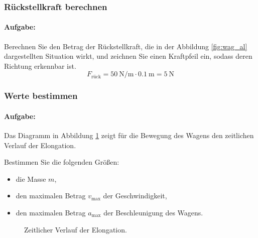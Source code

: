 \documentclass{ajc}
\begin{document}
	\subsubsection{Rückstellkraft berechnen}
	\paragraph{Aufgabe:}Berechnen Sie den Betrag der Rückstellkraft, die in der Abbildung \ref{fig:wag_al} dargestellten Situation wirkt, und zeichnen Sie einen Kraftpfeil ein, sodass deren Richtung erkennbar ist.
	\begin{equation}
		F_\text{rück} = \SI{50}{\newton\per\meter} \cdot \SI{0.1}{\meter} = \SI{5}{\newton}
	\end{equation}
	
	\subsubsection{Werte bestimmen}
	\paragraph{Aufgabe:}Das Diagramm in Abbildung \ref{fig:wag_dia} zeigt für die Bewegung des Wagens den zeitlichen Verlauf der Elongation.
	
	Bestimmen Sie die folgenden Größen:
	\begin{itemize}
		\item die Masse $m$,
		\item den maximalen Betrag $v_\text{max}$ der Geschwindigkeit,
		\item den maximalen Betrag $a_\text{max}$ der Beschleunigung des Wagens.
	\end{itemize}
	
	\begin{figure}[ht]
		\centering
		\caption{Zeitlicher Verlauf der Elongation.}
		\label{fig:wag_dia}
	\end{figure}
	
\end{document}
